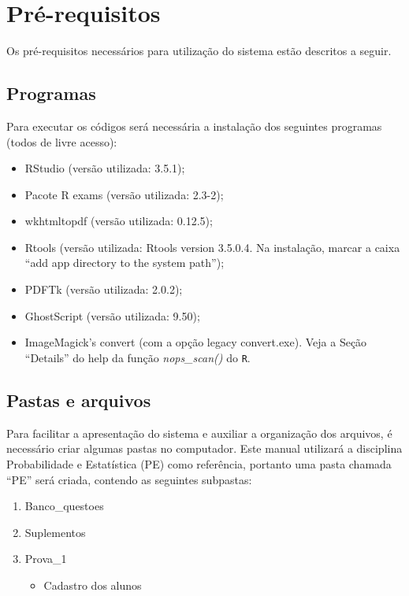 \documentclass[a4paper]{report}
\providecommand{\tightlist}{%
  \setlength{\itemsep}{0pt}\setlength{\parskip}{0pt}}
\begin{document}
\section{Pré-requisitos} \label{sec:requisitos}

Os pré-requisitos necessários para utilização do sistema estão descritos
a seguir.

\subsection{Programas}

Para executar os códigos será necessária a instalação dos seguintes
programas (todos de livre acesso):

\begin{itemize}
\tightlist
\item
  RStudio (versão utilizada: 3.5.1);
\item
  Pacote R exams (versão utilizada: 2.3-2);
\item
  wkhtmltopdf (versão utilizada: 0.12.5);
\item
  Rtools (versão utilizada: Rtools version 3.5.0.4. Na instalação,
  marcar a caixa ``add app directory to the system path'');
\item
  PDFTk (versão utilizada: 2.0.2);
\item
  GhostScript (versão utilizada: 9.50);
\item
  ImageMagick's convert (com a opção legacy convert.exe). Veja a Seção
  ``Details'' do help da função \emph{nops\_scan()} do \texttt{R}.
\end{itemize}

\subsection{Pastas e arquivos}

Para facilitar a apresentação do sistema e auxiliar a organização dos
arquivos, é necessário criar algumas pastas no computador. Este manual
utilizará a disciplina Probabilidade e Estatística (PE) como referência,
portanto uma pasta chamada ``PE'' será criada, contendo as seguintes
subpastas:

\begin{enumerate}
\def\labelenumi{\roman{enumi}.}
\tightlist
\item
  Banco\_questoes
\item
  Suplementos
\item
  Prova\_1

  \begin{itemize}
  \tightlist
  \item
    Cadastro dos alunos
  \end{itemize}
\end{enumerate}
\end{document}
